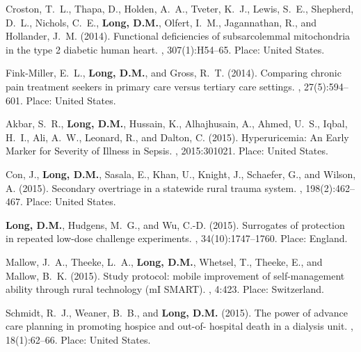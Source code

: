 \begin{thebibliography}{}
Croston, T.~L., Thapa, D., Holden, A.~A., Tveter, K.~J., Lewis, S.~E.,
  Shepherd, D.~L., Nichols, C.~E., \textbf{Long, D.M.}, Olfert, I.~M., Jagannathan, R.,
  and Hollander, J.~M. (2014).
\newblock Functional deficiencies of subsarcolemmal mitochondria in the type 2
  diabetic human heart.
, 307(1):H54--65.
\newblock Place: United States.

Fink-Miller, E.~L., \textbf{Long, D.M.}, and Gross, R.~T. (2014).
\newblock Comparing chronic pain treatment seekers in primary care versus
  tertiary care settings.
,
  27(5):594--601.
\newblock Place: United States.

Akbar, S.~R., \textbf{Long, D.M.}, Hussain, K., Alhajhusain, A., Ahmed, U.~S., Iqbal,
  H.~I., Ali, A.~W., Leonard, R., and Dalton, C. (2015).
\newblock Hyperuricemia: {An} {Early} {Marker} for {Severity} of {Illness} in
  {Sepsis}.
, 2015:301021.
\newblock Place: United States.

Con, J., \textbf{Long, D.M.}, Sasala, E., Khan, U., Knight, J., Schaefer, G., and Wilson,
  A. (2015).
\newblock Secondary overtriage in a statewide rural trauma system.
, 198(2):462--467.
\newblock Place: United States.

\textbf{Long, D.M.}, Hudgens, M.~G., and Wu, C.-D. (2015).
\newblock Surrogates of protection in repeated low-dose challenge experiments.
, 34(10):1747--1760.
\newblock Place: England.

Mallow, J.~A., Theeke, L.~A., \textbf{Long, D.M.}, Whetsel, T., Theeke, E., and Mallow,
  B.~K. (2015).
\newblock Study protocol: mobile improvement of self-management ability through
  rural technology ({mI} {SMART}).
, 4:423.
\newblock Place: Switzerland.

Schmidt, R.~J., Weaner, B.~B., and \textbf{Long, D.M.} (2015).
\newblock The power of advance care planning in promoting hospice and out-of-
  hospital death in a dialysis unit.
, 18(1):62--66.
\newblock Place: United States.


\end{thebibliography}
